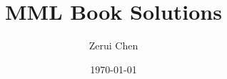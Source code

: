 \documentclass[a4paper,12pt]{article}
\begin{document}
\title{MML Book Solutions}
\author{Zerui Chen}
\date{\today}

\maketitle

\tableofcontents

\newpage


\newpage

\end{document}

